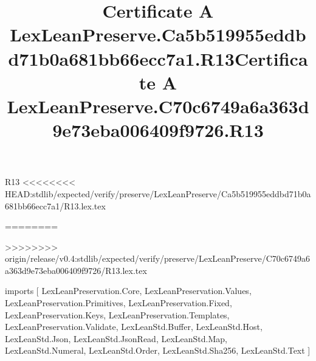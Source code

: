 \begin{lexlean}{R13}
<<<<<<<< HEAD:stdlib/expected/verify/preserve/LexLeanPreserve/Ca5b519955eddbd71b0a681bb66ecc7a1/R13.lex.tex
\title{Certificate A LexLeanPreserve.Ca5b519955eddbd71b0a681bb66ecc7a1.R13}
========
\title{Certificate A LexLeanPreserve.C70c6749a6a363d9e73eba006409f9726.R13}
>>>>>>>> origin/release/v0.4:stdlib/expected/verify/preserve/LexLeanPreserve/C70c6749a6a363d9e73eba006409f9726/R13.lex.tex
\begin{coremodule}
imports [
  LexLeanPreservation.Core,
  LexLeanPreservation.Values,
  LexLeanPreservation.Primitives,
  LexLeanPreservation.Fixed,
  LexLeanPreservation.Keys,
  LexLeanPreservation.Templates,
  LexLeanPreservation.Validate,
  LexLeanStd.Buffer,
  LexLeanStd.Host,
  LexLeanStd.Json,
  LexLeanStd.JsonRead,
  LexLeanStd.Map,
  LexLeanStd.Numeral,
  LexLeanStd.Order,
  LexLeanStd.Sha256,
  LexLeanStd.Text
]


\end{coremodule}
\end{lexlean}
